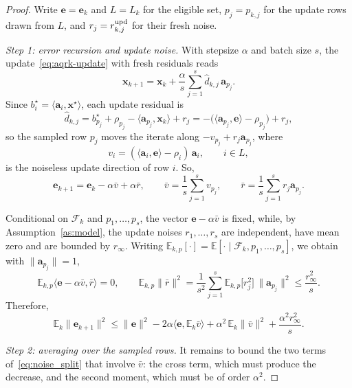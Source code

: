 \documentclass[pdflatex,sn-mathphys-num]{sn-jnl}
\theoremstyle{thmstyleone}
\theoremstyle{thmstylethree}
\newcommand{\proofstep}[1]{\par\medskip\noindent\emph{#1}}
\newcommand{\vx}{\mathbf{x}}
\newcommand{\va}{\mathbf{a}}
\newcommand{\ve}{\mathbf{e}}
\begin{document}
\begin{proof}
Write $\ve=\ve_k$ and $L=L_k$ for the eligible set, $p_j=p_{k,j}$ for the
update rows drawn from $L$, and $r_j=r^{\rm upd}_{k,j}$ for their fresh noise.

\proofstep{Step 1: error recursion and update noise.} With
stepsize $\alpha$ and batch size $s$, the update~\eqref{eq:aqrk-update} with
fresh residuals reads
\[
\vx_{k+1}=\vx_k+\frac{\alpha}{s}\sum_{j=1}^s\widehat d_{k,j}\,\va_{p_j}.
\]
Since $b_i^\star=\langle\va_i,\vx^\star\rangle$, each update residual is
\[
\widehat d_{k,j}=b_{p_j}^\star+\rho_{p_j}-\langle\va_{p_j},\vx_k\rangle
+r_j
=-\bigl(\langle\va_{p_j},\ve\rangle-\rho_{p_j}\bigr)+r_j,
\]
so the sampled row $p_j$ moves the iterate along $-v_{p_j}+r_j\va_{p_j}$,
where
\[
v_i=(\langle\va_i,\ve\rangle-\rho_i)\,\va_i,\qquad i\in L,
\]
is the noiseless update direction of row $i$. So,
\[
\ve_{k+1}=\ve_k-\alpha\bar v+\alpha\bar r,
\qquad
\bar v=\frac1s\sum_{j=1}^s v_{p_j},
\qquad
\bar r=\frac1s\sum_{j=1}^s r_j\va_{p_j}.
\]

Conditional on $\mathcal F_k$ and $p_1,\ldots,p_s$, the
vector $\ve-\alpha\bar v$ is fixed, while, by Assumption~\ref{as:model}, the
update noises $r_1,\ldots,r_s$ are independent,
have mean zero and are bounded by $r_\infty$. Writing
$\mathbb E_{k,p}[\cdot]=\mathbb E[\cdot\mid\mathcal F_k,p_1,\ldots,p_s]$, we
obtain with $\|\va_{p_j}\|=1$,
\[
\mathbb E_{k,p}\langle\ve-\alpha\bar v,\bar r\rangle=0,
\qquad
\mathbb E_{k,p}\|\bar r\|^2
=\frac{1}{s^2}\sum_{j=1}^s\mathbb E_{k,p}\bigl[r_j^2\bigr]
\,\|\va_{p_j}\|^2
\le\frac{r_\infty^2}{s}.
\] Therefore,
\begin{equation}
\label{eq:noise_split}
\mathbb E_k\|\ve_{k+1}\|^2
\le\|\ve\|^2-2\alpha\langle\ve,\mathbb E_k\bar v\rangle
+\alpha^2\,\mathbb E_k\|\bar v\|^2+\frac{\alpha^2r_\infty^2}{s}.
\end{equation}

\proofstep{Step 2: averaging over the sampled rows.} It remains to
bound the two terms of~\eqref{eq:noise_split} that involve $\bar v$: the cross
term, which must produce the decrease, and the second moment, which must be of
order $\alpha^2$. 


\end{proof}
\end{document}
